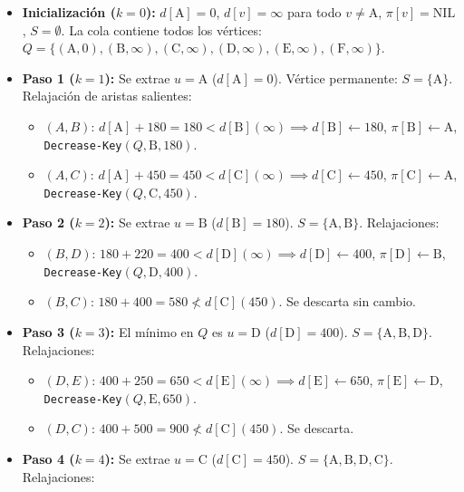 \begin{itemize}
    \item \textbf{Inicialización ($k=0$):} $d[\text{A}]=0$, $d[v]=\infty$ para todo $v \ne \text{A}$, $\pi[v]=\text{NIL}$, $S=\emptyset$. La cola contiene todos los vértices: $Q = \{(\text{A}, 0), (\text{B}, \infty), (\text{C}, \infty), (\text{D}, \infty), (\text{E}, \infty), (\text{F}, \infty)\}$.
    \item \textbf{Paso 1 ($k=1$):} Se extrae $u = \text{A}$ ($d[\text{A}]=0$). Vértice permanente: $S = \{\text{A}\}$. Relajación de aristas salientes:
    \begin{itemize}
        \item $(A, B)$: $d[\text{A}] + 180 = 180 < d[\text{B}] (\infty) \implies d[\text{B}] \leftarrow 180$, $\pi[\text{B}] \leftarrow \text{A}$, \texttt{Decrease-Key}$(Q, \text{B}, 180)$.
        \item $(A, C)$: $d[\text{A}] + 450 = 450 < d[\text{C}] (\infty) \implies d[\text{C}] \leftarrow 450$, $\pi[\text{C}] \leftarrow \text{A}$, \texttt{Decrease-Key}$(Q, \text{C}, 450)$.
    \end{itemize}
    \item \textbf{Paso 2 ($k=2$):} Se extrae $u = \text{B}$ ($d[\text{B}]=180$). $S = \{\text{A}, \text{B}\}$. Relajaciones:
    \begin{itemize}
        \item $(B, D)$: $180 + 220 = 400 < d[\text{D}] (\infty) \implies d[\text{D}] \leftarrow 400$, $\pi[\text{D}] \leftarrow \text{B}$, \texttt{Decrease-Key}$(Q, \text{D}, 400)$.
        \item $(B, C)$: $180 + 400 = 580 \not< d[\text{C}] (450)$. Se descarta sin cambio.
    \end{itemize}
    \item \textbf{Paso 3 ($k=3$):} El mínimo en $Q$ es $u = \text{D}$ ($d[\text{D}]=400$). $S = \{\text{A}, \text{B}, \text{D}\}$. Relajaciones:
    \begin{itemize}
        \item $(D, E)$: $400 + 250 = 650 < d[\text{E}] (\infty) \implies d[\text{E}] \leftarrow 650$, $\pi[\text{E}] \leftarrow \text{D}$, \texttt{Decrease-Key}$(Q, \text{E}, 650)$.
        \item $(D, C)$: $400 + 500 = 900 \not< d[\text{C}] (450)$. Se descarta.
    \end{itemize}
    \item \textbf{Paso 4 ($k=4$):} Se extrae $u = \text{C}$ ($d[\text{C}]=450$). $S = \{\text{A}, \text{B}, \text{D}, \text{C}\}$. Relajaciones:

\end{itemize}
